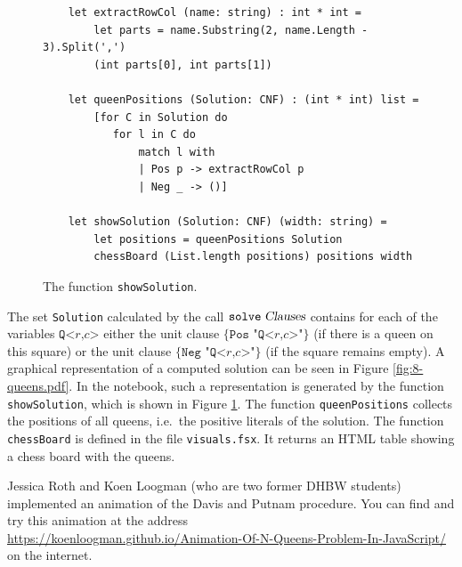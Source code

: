 \begin{figure}[!ht]
\centering
\begin{verbatim}
    let extractRowCol (name: string) : int * int =
        let parts = name.Substring(2, name.Length - 3).Split(',')
        (int parts[0], int parts[1])

    let queenPositions (Solution: CNF) : (int * int) list =
        [for C in Solution do
           for l in C do
               match l with
               | Pos p -> extractRowCol p
               | Neg _ -> ()]

    let showSolution (Solution: CNF) (width: string) =
        let positions = queenPositions Solution
        chessBoard (List.length positions) positions width
\end{verbatim}
\vspace*{-0.3cm}
\caption{The function \texttt{showSolution}.}
\label{fig:printBoard}
\end{figure}

The set \texttt{Solution} calculated by the call $\texttt{solve}\;\textsl{Clauses}$ contains for each of the variables $\texttt{Q<}r\texttt{,}c\texttt{>}$
either the unit clause $\{\texttt{Pos "Q<}r\texttt{,}c\texttt{>"}\}$ (if there is a queen on this square) or
the unit clause $\{ \texttt{Neg "Q<}r\texttt{,}c\texttt{>"}\}$ (if the square remains empty).
A graphical representation of a computed solution can be seen in Figure \ref{fig:8-queens.pdf}.
In the notebook, such a representation is generated by the function \texttt{showSolution}, which is shown in
Figure \ref{fig:printBoard}.  The function \texttt{queenPositions} collects the positions of all queens, i.e.~the
positive literals of the solution.  The function \texttt{chessBoard} is defined in the file \texttt{visuals.fsx}.
It returns an HTML table showing a chess board with the queens.

Jessica Roth and Koen Loogman (who are two former DHBW students) implemented an animation of the Davis and Putnam procedure. You can find and try this animation at the address
\\[0.2cm]
\hspace*{1.3cm}
\href{https://koenloogman.github.io/Animation-Of-N-Queens-Problem-In-JavaScript/}{https://koenloogman.github.io/Animation-Of-N-Queens-Problem-In-JavaScript/}
\\[0.2cm]
on the internet.

